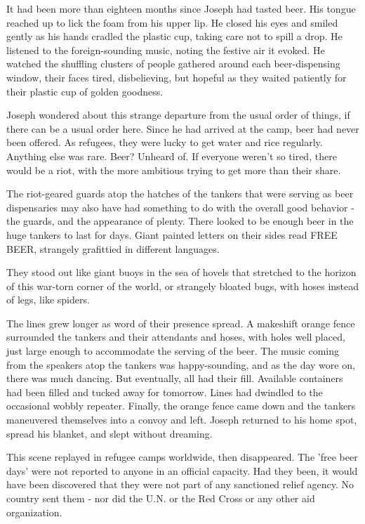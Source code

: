 It had been more than eighteen months since Joseph had tasted beer. His
tongue reached up to lick the foam from his upper lip. He closed his
eyes and smiled gently as his hands cradled the plastic cup, taking care
not to spill a drop. He listened to the foreign-sounding music, noting
the festive air it evoked. He watched the shuffling clusters of people
gathered around each beer-dispensing window, their faces tired,
disbelieving, but hopeful as they waited patiently for their plastic cup
of golden goodness.

Joseph wondered about this strange departure from the usual order of
things, if there can be a usual order here. Since he had arrived at the
camp, beer had never been offered. As refugees, they were lucky to get
water and rice regularly. Anything else was rare. Beer? Unheard of. If
everyone weren't so tired, there would be a riot, with the more
ambitious trying to get more than their share.

The riot-geared guards atop the hatches of the tankers that were serving
as beer dispensaries may also have had something to do with the overall
good behavior - the guards, and the appearance of plenty. There looked
to be enough beer in the huge tankers to last for days. Giant painted
letters on their sides read FREE BEER, strangely grafittied in different
languages.

They stood out like giant buoys in the sea of hovels that stretched to
the horizon of this war-torn corner of the world, or strangely bloated
bugs, with hoses instead of legs, like spiders.

The lines grew longer as word of their presence spread. A makeshift
orange fence surrounded the tankers and their attendants and hoses, with
holes well placed, just large enough to accommodate the serving of the
beer. The music coming from the speakers atop the tankers was
happy-sounding, and as the day wore on, there was much dancing. But
eventually, all had their fill. Available containers had been filled and
tucked away for tomorrow. Lines had dwindled to the occasional wobbly
repeater. Finally, the orange fence came down and the tankers maneuvered
themselves into a convoy and left. Joseph returned to his home spot,
spread his blanket, and slept without dreaming.

This scene replayed in refugee camps worldwide, then disappeared. The
'free beer days' were not reported to anyone in an official capacity.
Had they been, it would have been discovered that they were not part of
any sanctioned relief agency. No country sent them - nor did the U.N. or
the Red Cross or any other aid organization.

